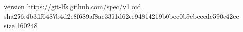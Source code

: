version https://git-lfs.github.com/spec/v1
oid sha256:4b3df6487b4d2e8f689af8ac3361d62ee94814219b0bec0b9ebceedc590e42ee
size 160248
